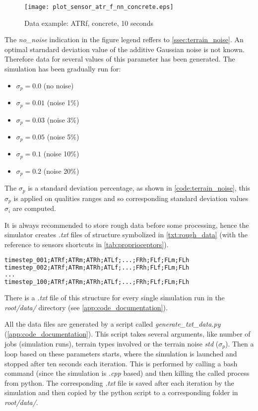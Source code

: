 \begin{figure}[H]
  \centering
  \texttt{[image: plot\_sensor\_atr\_f\_nn\_concrete.eps]}
  \caption{Data example: ATRf, concrete, 10 seconds}
  \label{fig:data_example}
\end{figure}

The \textit{no\_noise} indication in the figure legend reffers to \cref{ssec:terrain_noise}. An optimal starndard deviation value of the additive Gaussian noise is not known. Therefore data for several values of this parameter has been generated. The simulation has been gradually run for:

\begin{itemize}
\item $ \sigma_p = 0.0 $ (no noise)
\item $ \sigma_p = 0.01 $ (noise 1\%)
\item $ \sigma_p = 0.03 $ (noise 3\%)
\item $ \sigma_p = 0.05 $ (noise 5\%)
\item $ \sigma_p = 0.1 $ (noise 10\%)
\item $ \sigma_p = 0.2 $ (noise 20\%)
\end{itemize}

The $ \sigma_p $ is a standard deviation percentage, as shown in \cref{code:terrain_noise}, this $ \sigma_p $ is applied on qualities ranges and so corresponding standard deviation values $ \sigma_i $ are computed.

It is always recommended to store rough data before some processing, hence the simulator creates \textit{.txt} files of structure symbolized in \cref{txt:rough_data} (with the reference to sensors shortcuts in \cref{tab:proprioceptors}). 

\begin{lstlisting}[language=XML, caption={Rough sensory data files structure}, label=txt:rough_data]
timestep_001;ATRf;ATRm;ATRh;ATLf;...;FRh;FLf;FLm;FLh
timestep_002;ATRf;ATRm;ATRh;ATLf;...;FRh;FLf;FLm;FLh
...
timestep_100;ATRf;ATRm;ATRh;ATLf;...;FRh;FLf;FLm;FLh
\end{lstlisting}

There is a \textit{.txt} file of this structure for every single simulation run in the \textit{root/data/} directory (see \cref{app:code_documentation}).

All the data files are generated by a script called \textit{generate\_txt\_data.py} (\ref{app:code_documentation}). This script takes several arguments, like number of jobs (simulation runs), terrain types involved or the terrain noise \textit{std} ($ \sigma_p $). Then a loop based on these parameters starts, where the simulation is launched and stopped after ten seconds each iteration. This is performed by calling a bash command (since the simulation is \textit{.cpp} based) and then killing the called process from python. The corresponding \textit{.txt} file is saved after each iteration by the simulation and then copied by the python script to a corresponding folder in \textit{root/data/}.

